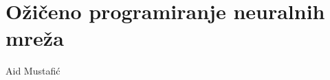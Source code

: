 \documentclass[11pt]{book}
\begin{document}
\setcounter{chapter}{4}
\setcounter{page}{1}


\lstset{language=VHDL}

\chapter{Ožičeno programiranje neuralnih mreža}
\begin{center}
    Aid Mustafić
\end{center}







%


\end{document}
